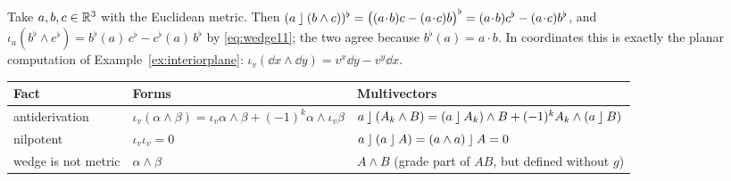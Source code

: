 \begin{example}\label{ex:lcvsiota}
Take $a,b,c\in\mathbb{R}^3$ with the Euclidean metric. Then $(a\lc(b\wedge c))^\flat=\bigl((a\!\cdot\!b)c-(a\!\cdot\!c)b\bigr)^\flat=(a\!\cdot\!b)c^\flat-(a\!\cdot\!c)b^\flat$, and
$\iota_a(b^\flat\wedge c^\flat)=b^\flat(a)\,c^\flat-c^\flat(a)\,b^\flat$ by \eqref{eq:wedge11}; the two agree because $b^\flat(a)=a\cdot b$. In coordinates this is exactly
the planar computation of Example~\ref{ex:interiorplane}: $\iota_v(\dd x\wedge\dd y)=v^x\dd y-v^y\dd x$.
\end{example}

\begin{synthesis}
\renewcommand{\arraystretch}{1.3}
\begin{center}\small
\begin{tabular}{@{}p{3.6cm}p{4.0cm}p{4.0cm}@{}}
\toprule
\textbf{Fact} & \textbf{Forms} & \textbf{Multivectors}\\
\midrule
antiderivation & $\iota_v(\alpha\wedge\beta)=\iota_v\alpha\wedge\beta+(-1)^k\alpha\wedge\iota_v\beta$ & $a\mathbin{\rfloor}(A_k\wedge B)=(a\mathbin{\rfloor} A_k)\wedge B+(-1)^kA_k\wedge(a\mathbin{\rfloor} B)$\\
nilpotent & $\iota_v\iota_v=0$ & $a\mathbin{\rfloor}(a\mathbin{\rfloor} A)=(a\wedge a)\mathbin{\rfloor} A=0$\\
wedge is not metric & $\alpha\wedge\beta$ & $A\wedge B$ (grade part of $AB$, but defined without $g$)\\
\bottomrule
\end{tabular}
\end{center}
\end{synthesis}
